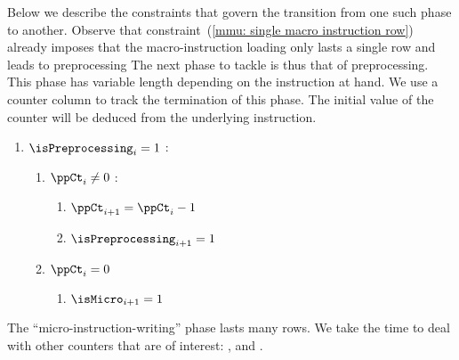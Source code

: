 Below we describe the constraints that govern the transition from one such phase to another.
Observe that constraint~(\ref{mmu: single macro instruction row}) already imposes that the macro-instruction loading only lasts a single row and leads to preprocessing
The next phase to tackle is thus that of preprocessing.
This phase has variable length depending on the instruction at hand.
We use a counter column to track the termination of this phase.
The initial value of the counter will be deduced from the underlying \mmuMod{} instruction.
\begin{enumerate} [resume]
	\item \If $\isPreprocessing_{i} = 1$ \Then: 
		\begin{enumerate}
			\item  \If $\ppCt_{i} \neq 0$ \Then:
				\begin{enumerate}
					\item $\ppCt_{i + 1} = \ppCt_{i} - 1$
					\item $\isPreprocessing_{i + 1} = 1$
				\end{enumerate}
			\item  \If $\ppCt_{i} = 0$ \Then
				\begin{enumerate}
				    \item $\isMicro_{i + 1} = 1$
				\end{enumerate}
		\end{enumerate}
\end{enumerate}
The ``micro-instruction-writing'' phase lasts \ppTot{} many rows.
We take the time to deal with other counters that are of interest:
\ppTotLZ{},
\ppTotNT{} and
\ppTotRZ{}.
